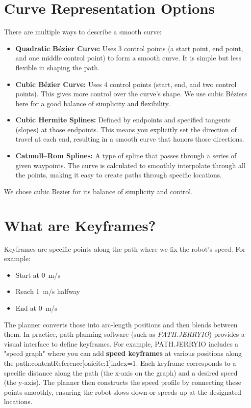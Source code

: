 \documentclass[11pt]{article}
\begin{document}
\section{Curve Representation Options}

There are multiple ways to describe a smooth curve:

\begin{itemize}
  \item \textbf{Quadratic Bézier Curve:} Uses 3 control points (a start point, end point, and one middle control point) to form a smooth curve. It is simple but less flexible in shaping the path.
  \item \textbf{Cubic Bézier Curve:} Uses 4 control points (start, end, and two control points). This gives more control over the curve's shape. We use cubic Béziers here for a good balance of simplicity and flexibility.
  \item \textbf{Cubic Hermite Splines:} Defined by endpoints and specified tangents (slopes) at those endpoints. This means you explicitly set the direction of travel at each end, resulting in a smooth curve that honors those directions.
  \item \textbf{Catmull--Rom Splines:} A type of spline that passes through a series of given waypoints. The curve is calculated to smoothly interpolate through all the points, making it easy to create paths through specific locations.
\end{itemize}

We chose cubic Bezier for its balance of simplicity and control.

\section{What are Keyframes?}

Keyframes are specific points along the path where we fix the robot’s speed. For example:

\begin{itemize}
  \item Start at 0~m/s
  \item Reach 1~m/s halfway
  \item End at 0~m/s
\end{itemize}

The planner converts those into arc‐length positions and then blends between them. In practice, path planning software (such as \textit{PATH.JERRYIO}) provides a visual interface to define keyframes. For example, PATH.JERRYIO includes a "speed graph" where you can add \textbf{speed keyframes} at various positions along the path:contentReference[oaicite:1]{index=1}. Each keyframe corresponds to a specific distance along the path (the x-axis on the graph) and a desired speed (the y-axis). The planner then constructs the speed profile by connecting these points smoothly, ensuring the robot slows down or speeds up at the designated locations.
\end{document}
